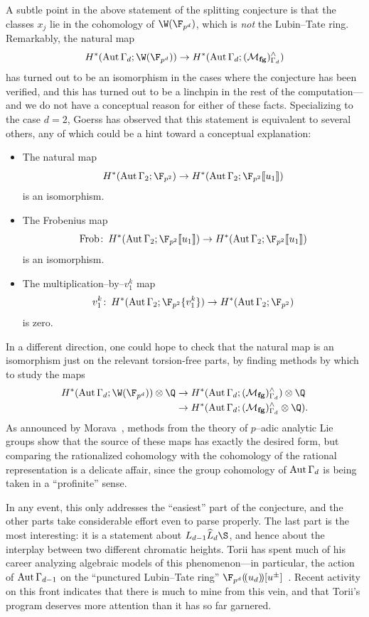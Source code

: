 A subtle point in the above statement of the splitting conjecture is that the classes \(x_j\) lie in the cohomology of \(\W(\F_{p^d})\), which is \emph{not} the Lubin--Tate ring.
Remarkably, the natural map \[H^*(\Aut \Gamma_d; \W(\F_{p^d})) \to H^*(\Aut \Gamma_d; (\moduli{fg})^\wedge_{\Gamma_d})\] has turned out to be an isomorphism in the cases where the conjecture has been verified, and this has turned out to be a linchpin in the rest of the computation---and we do not have a conceptual reason for either of these facts.
Specializing to the case \(d = 2\), Goerss has observed that this statement is equivalent to several others, any of which could be a hint toward a conceptual explanation:
\begin{itemize}
    \item The natural map \[H^*(\Aut \Gamma_2; \F_{p^2}) \to H^*(\Aut \Gamma_2; \F_{p^2}\ps{u_1})\] is an isomorphism.
    \item The Frobenius map \[\Frob\co H^*(\Aut \Gamma_2; \F_{p^2}\ps{u_1}) \to H^*(\Aut \Gamma_2; \F_{p^2}\ps{u_1})\] is an isomorphism.
    \item The multiplication--by--\(v_1^k\) map \[v_1^k\co H^*(\Aut \Gamma_2; \F_{p^2}\{v_1^k\}) \to H^*(\Aut \Gamma_2; \F_{p^2})\] is zero.
\end{itemize}
In a different direction, one could hope to check that the natural map is an isomorphism just on the relevant torsion-free parts, by finding methods by which to study the maps
\begin{align*}
H^*(\Aut \Gamma_d; \W(\F_{p^d})) \otimes \Q & \to H^*(\Aut \Gamma_d; (\moduli{fg})^\wedge_{\Gamma_d}) \otimes \Q \\
& \to H^*(\Aut \Gamma_d; (\moduli{fg})^\wedge_{\Gamma_d} \otimes \Q).
\end{align*}
As announced by Morava~\cite[Remark 2.2.5]{MoravaCobordismComodules}, methods from the theory of \(p\)--adic analytic Lie groups show that the source of these maps has exactly the desired form, but comparing the rationalized cohomology with the cohomology of the rational representation is a delicate affair, since the group cohomology of \(\operatorname{Aut} \Gamma_d\) is being taken in a ``profinite'' sense.

In any event, this only addresses the ``easiest'' part of the conjecture, and the other parts take considerable effort even to parse properly.
The last part is the most interesting: it is a statement about \(L_{d-1} \widehat L_d \S\), and hence about the interplay between two different chromatic heights.
Torii has spent much of his career analyzing algebraic models of this phenomenon---in particular, the action of \(\operatorname{Aut} \Gamma_{d-1}\) on the ``punctured Lubin--Tate ring'' \(\F_{p^d}(\!(u_d)\!)[u^\pm]\)~\cite{Torii1,Torii2,Torii4,Torii3,Torii5}.
Recent activity on this front indicates that there is much to mine from this vein, and that Torii's program deserves more attention than it has so far garnered.

